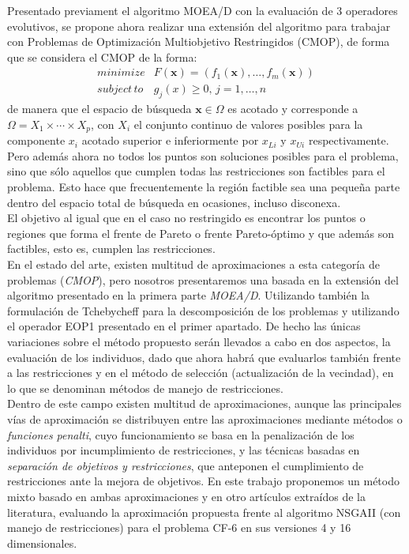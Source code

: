 \justify

Presentado previament el algoritmo MOEA/D con la evaluación de 3 operadores evolutivos, se propone ahora realizar una extensión del algoritmo para trabajar con Problemas de Optimización Multiobjetivo Restringidos (CMOP), de forma que se considera el CMOP de la forma:$$ \begin{array}{ll}minimize & F(\boldsymbol{x})=(f_1(\boldsymbol{x}), \dots, f_m(\boldsymbol{x}))\\
subject \, to & g_j(x) \geq 0, \, j=1, \dots, n
\end{array} $$ de manera que el espacio de búsqueda $\boldsymbol{x} \in \Omega$ es acotado y corresponde a $\Omega = X_1 \times \cdots \times X_p$, con $X_i$ el conjunto continuo de valores posibles para la componente $x_i$ acotado superior e inferiormente por $x_{Li}$ y $x_{Ui}$ respectivamente. Pero además ahora no todos los puntos son soluciones posibles para el problema, sino que sólo aquellos que cumplen todas las restricciones son factibles para el problema. Esto hace que frecuentemente la región factible sea una pequeña parte dentro del espacio total de búsqueda en ocasiones, incluso disconexa.\\

El objetivo al igual que en el caso no restringido es encontrar los puntos o regiones que forma el frente de Pareto o frente Pareto-óptimo y que además son factibles, esto es, cumplen las restricciones.\\

En el estado del arte, existen multitud de aproximaciones a esta categoría de problemas (\textit{CMOP}), pero nosotros presentaremos una basada en la extensión del algoritmo presentado en la primera parte \textit{MOEA/D}. Utilizando también la formulación de Tchebycheff para la descomposición de los problemas y utilizando el operador EOP1 presentado en el primer apartado. De hecho las únicas variaciones sobre el método propuesto serán llevados a cabo en dos aspectos, la evaluación de los  individuos, dado que ahora habrá que evaluarlos también frente a las restricciones y en el método de selección (actualización de la vecindad), en lo que se denominan métodos de manejo de restricciones.\\

Dentro de este campo existen multitud de aproximaciones, aunque las principales vías de aproximación se distribuyen entre las aproximaciones mediante métodos o \textit{funciones penalti}, cuyo funcionamiento se basa en la penalización de los individuos por incumplimiento de restricciones, y las técnicas basadas en \textit{separación de objetivos y restricciones}, que anteponen el cumplimiento de restricciones ante la mejora de objetivos.  En este trabajo proponemos un método mixto basado en ambas aproximaciones y en otro artículos extraídos de la literatura, evaluando la aproximación propuesta frente al algoritmo NSGAII (con manejo de restricciones) para el problema CF-6 en sus versiones 4 y 16 dimensionales.\\



